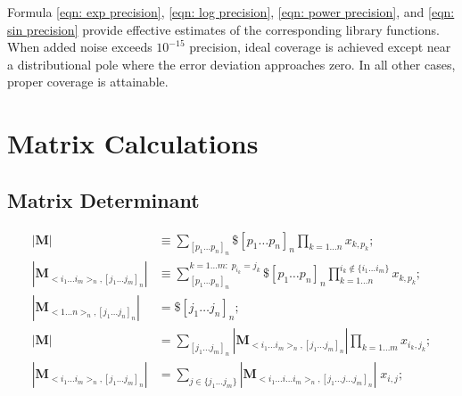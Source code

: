 \documentclass[twoside]{article}
\numberwithin{equation}{section}
\newcommand{\Verbose}{}
\begin{document}
Formula \eqref{eqn: exp precision}, \eqref{eqn: log precision}, \eqref{eqn: power precision}, and \eqref{eqn: sin precision} provide effective estimates of the corresponding library functions.
When added noise exceeds $10^{-15}$ precision, ideal coverage is achieved except near a distributional pole where the error deviation approaches zero.
In all other cases, proper coverage is attainable.


\ifdefined\Verbose
\clearpage
\fi
\section{Matrix Calculations}
\label{sec: matrix}


\subsection{Matrix Determinant}

\iffalse

\begin{align*}
|\mathbf{M}| &\equiv \sum_{[p_1\dots p_n]_n} \$ [p_1\dots p_n]_n \prod_{k=1 \dots n} x_{k,p_{k}}; \\
|\mathbf{M}_{<i_1 \dots i_m>_n, [j_1 \dots j_m]_n}| &\equiv \sum_{[p_1 \dots p_n]_n}^{k =1 \dots m:\; p_{i_k}=j_k} \$ [p_1\dots p_n]_n 
	\prod _{k = 1 \dots n }^{i_k \not\in \{i_1 \dots i_m\}} x_{k,p_{k}}; \\
|\mathbf{M}_{<1 \dots n>_n, [j_1 \dots j_n]_n}| &= \$ [j_1\dots j_n]_n; \\
|\mathbf{M}| &= \sum_{{[j_1 \dots j_m]}_n} |\mathbf{M} _{<i_1 \dots i_m>_n, [j_1 \dots j_m]_n}| \prod_{k=1 \dots m} x_{i_k, j_k}; \\
|\mathbf{M}_{<i_1 \dots i_m>_n, [j_1 \dots j_m]_n}| &= \sum_{j \in \{j_1 \dots j_m\}} |\mathbf{M}_{<i_1 \dots i \dots i_m>_n, [j_1 \dots j \dots j_m]_n}| \;x_{i, j};
\end{align*}
\end{document}
